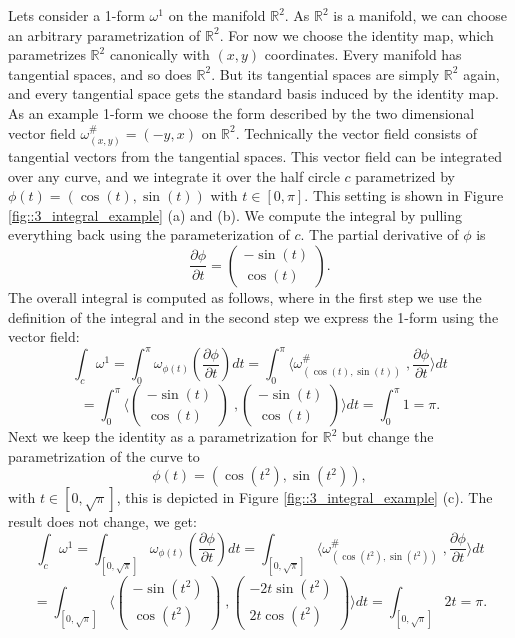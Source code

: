 Lets consider a 1-form $\omega^1$ on the manifold $\mathbb R^2$. As $\mathbb R^2$ is a manifold, we can choose an arbitrary parametrization of $\mathbb R^2$. For now we choose the identity map, which parametrizes $\mathbb R^2$ canonically with $(x,y)$ coordinates. Every manifold has tangential spaces, and so does $\mathbb R^2$. But its tangential spaces are simply $\mathbb R^2$ again, and every tangential space gets the standard basis induced by the identity map. 
As an example 1-form we choose the form described by the two dimensional vector field $\omega^\#_{(x,y)} = (-y,x)$ on $\mathbb R^2$. Technically the vector field consists of tangential vectors from the tangential spaces. This vector field can be integrated over any curve, and we integrate it over the half circle $c$ parametrized by $\phi(t) = (\cos(t), \sin(t))$ with $t\in [0, \pi]$. This setting is shown in Figure \ref{fig::3_integral_example} (a) and (b). We compute the integral by pulling everything back using the parameterization of $c$. The partial derivative of $\phi$ is
\[\frac{\partial \phi}{\partial t }  = \begin{pmatrix}
	-\sin(t)\\\cos(t)
\end{pmatrix}.\]
The overall integral is computed as follows, where in the first step we use the definition of the integral and in the second step we express the 1-form using the vector field:
\[\int_{c} \omega^1 = \int_0^\pi \omega_{\phi(t)}(\frac{\partial \phi}{\partial t } ) dt = \int_0^\pi \langle \omega^\# _{(\cos(t), \sin(t))}  \;,\frac{\partial \phi}{\partial t } \rangle dt \]
\[= \int_0^\pi \langle \begin{pmatrix}
	-\sin(t)\\\cos(t)
\end{pmatrix} \;, \begin{pmatrix}
	-\sin(t)\\\cos(t)
\end{pmatrix}\rangle dt
= \int_0^\pi 1 = \pi. \]
Next we keep the identity as a parametrization for $\mathbb R^2$ but change the parametrization of the curve to 
\[\phi(t) = (\cos(t^2), \sin(t^2) ),\]
with $t \in [0,\sqrt{\pi}]$, this is depicted in Figure \ref{fig::3_integral_example} (c). The result does not change, we get:
\[\int_{c} \omega^1 = \int_{[0,\sqrt{\pi}]} \omega_{\phi(t)}(\frac{\partial \phi}{\partial t } ) dt = \int_{[0,\sqrt{\pi}]} \langle \omega^\# _{(\cos(t^2), \sin(t^2))}  \;,\frac{\partial \phi}{\partial t } \rangle dt \]
\[=\int_{[0,\sqrt{\pi}]} \langle \begin{pmatrix}
	-\sin(t^2)\\\cos(t^2)
\end{pmatrix} \;, \begin{pmatrix}
	-2t\sin(t^2)\\2t\cos(t^2)
\end{pmatrix}\rangle dt
= \int_{[0,\sqrt{\pi}]} 2t = \pi. \]

